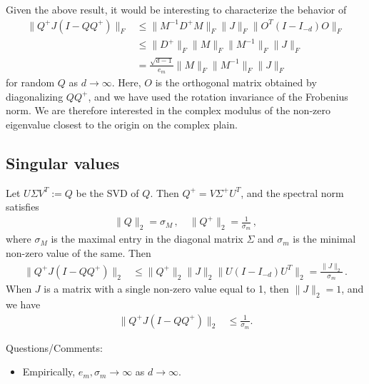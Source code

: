 \documentclass[twoside]{article}
\numberwithin{equation}{section}
\begin{document}
Given the above result, it would be interesting to characterize the behavior of 
\begin{align*}
	\lVert	Q^+ J (I-QQ^+)  \rVert_F &\leq \lVert M^{-1}D^+M \rVert_F \lVert J\rVert_F \lVert O^T (I-I_{-d}) O \rVert_F \\
	&\leq \lVert D^+ \rVert_F \lVert M\rVert_F \lVert M^{-1}\rVert_F \lVert J \rVert_F  \\
	&= \frac{\sqrt{d-1}}{e_m}\lVert M\rVert_F \lVert M^{-1}\rVert_F \lVert J \rVert_F  
\end{align*}
for random $Q$ as $d\rightarrow \infty$.  Here, $O$ is the orthogonal matrix obtained by diagonalizing $QQ^+$, and we have used the rotation invariance of the Frobenius norm. We are therefore interested in the complex modulus of the non-zero eigenvalue closest to the origin on the complex plain. 


\subsection{Singular values}

Let $U\Sigma V^T:=Q$ be the SVD of $Q$.  Then $Q^+=V\Sigma^+U^T$, and the spectral norm satisfies
\begin{align*}
	\lVert Q\rVert_2 = \sigma_M \, , \quad \lVert Q^+ \rVert_2 = \frac{1}{\sigma_m} \, ,
\end{align*}
where $\sigma_M$ is the maximal entry in the diagonal matrix $\Sigma$ and $\sigma_m$ is the minimal non-zero value of the same. Then
\begin{align*}
	\lVert	Q^+ J (I-QQ^+)  \rVert_2 &\leq \lVert Q^+ \rVert_2 \lVert J\rVert_2 \lVert U (I-I_{-d}) U^T \rVert_2 
	= \frac{\lVert J\rVert_2}{\sigma_m} \, .
\end{align*}
When $J$ is a matrix with a single non-zero value equal to 1, then $\lVert J\rVert_2=1$, and we have
\begin{align*}
	\lVert	Q^+ J (I-QQ^+)  \rVert_2 &\leq \frac{1}{\sigma_m}.
\end{align*}



Questions/Comments:
\begin{itemize}
	\item Empirically, $e_m, \sigma_m \rightarrow \infty$ as $d \rightarrow \infty$.
\end{itemize}
\end{document}
